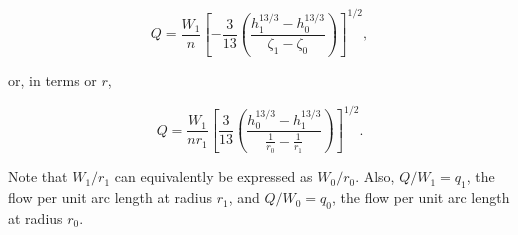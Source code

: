 \documentclass[fleqn]{article}
\begin{document}
\begin{equation}
  Q = \frac{W_{1}}{n} \left [ -\frac{3}{13} \left ( \frac{ h_{1}^{13/3} - h_{0}^{13/3}}{\zeta_{1} - \zeta_{0}} \right ) \right ]^{1/2},
  \label{eqn:manning_in_zeta_Q}
\end{equation}

\noindent or, in terms or $r$,

\begin{equation}
  Q = \frac{W_{1}}{n r_{1}} \left [\frac{3}{13} \left ( \frac{ h_{0}^{13/3} - h_{1}^{13/3}}{\frac{1}{r_{0}} -\frac{1}{r_{1}}} \right ) \right ]^{1/2}.
  \label{eqn:manning_in_zeta_Q}
\end{equation}

\noindent Note that $W_{1} / r_{1}$ can equivalently be expressed as $W_{0} / r_{0}$. Also, $Q/W_{1} = q_{1}$, the flow per unit arc length at radius $r_{1}$, and $Q/W_{0} = q_{0}$, the flow per unit arc length at radius $r_{0}$.
\end{document}
